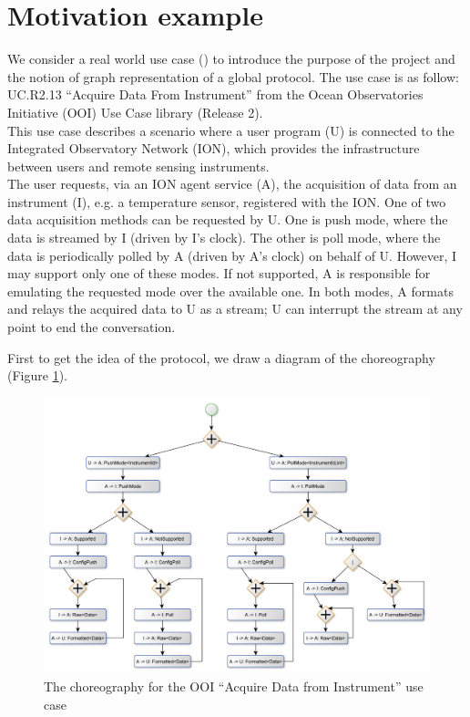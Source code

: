 \documentclass{article}
\begin{document}

\section{Motivation example}

We consider a real world use case (\cite{bocchisafety}) to introduce the purpose of the project and the notion of graph representation of a global protocol.
The use case is as follow: UC.R2.13 “Acquire Data From Instrument” from the Ocean Observatories Initiative (OOI) Use Case library (Release 2). \\
This use case describes a scenario where a user program (U) is connected to the Integrated Observatory Network (ION), which provides the infrastructure between users and remote sensing instruments.\\
The user requests, via an ION agent service (A), the acquisition of data from an instrument (I), e.g. a temperature sensor, registered with the ION. One of two data acquisition methods can be requested by U. One is push mode, where the data is streamed by I (driven by I’s clock). The other is poll mode, where the data is periodically polled by A (driven by A’s clock) on behalf of U. However, I may support only one of these modes. If not supported, A is responsible for emulating the requested mode over the available one. In both modes, A formats and relays the acquired data to U as a stream; U can interrupt the stream at any point to end the conversation.

First to get the idea of the protocol, we draw a diagram of the choreography (Figure \ref{fig:ooi_graph}).

\begin{figure}[h]
\begin{center}
\includegraphics[scale=0.45]{ooi_graph}
\end{center}
\caption{The choreography for the OOI ``Acquire Data from Instrument'' use case}\label{fig:ooi_graph}
\end{figure}
\end{document}
